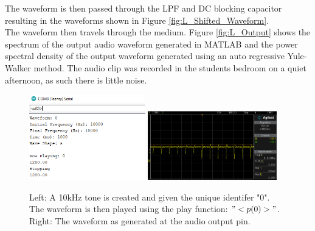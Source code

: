 \documentclass[12pt, a4paper]{article}
\begin{document}
The waveform is then passed through the LPF and DC blocking capacitor resulting in the waveforms shown in Figure \ref{fig:L_Shifted_Waveform}. \\

The waveform then travels through the medium. Figure \ref{fig:L_Output} shows the spectrum of the output audio waveform generated in MATLAB and the power spectral density of the output waveform generated using an auto regressive Yule-Walker method. The audio clip was recorded in the students bedroom on a quiet afternoon, as such there is little noise. \\

\begin{figure} [!htb]
	\captionsetup{justification=centering}
	\hfill\includegraphics[width=0.45\textwidth]{./images/speaker/L_Create_Waveform}\hspace{\fill}
	\includegraphics[width=0.5\textwidth]{./images/speaker/L_Generated_Sinusoidal_PWM}\hspace{\fill}
	\caption{Left: A 10kHz tone is created and given the unique identifer "0". The waveform is then played using the play function: $"<p(0)>"$. Right: The waveform as generated at the audio output pin.}
	\label{fig:L_Create_Waveform}
\end{figure}
\end{document}

